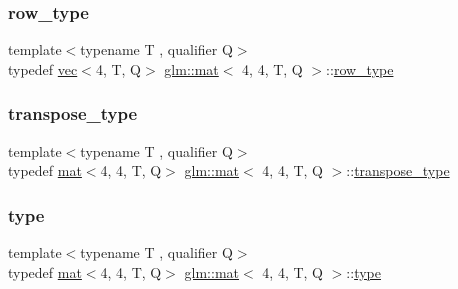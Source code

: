 \subsubsection{\texorpdfstring{row\+\_\+type}{row\_type}}
{\footnotesize\ttfamily template$<$typename T , qualifier Q$>$ \\
typedef \mbox{\hyperlink{structglm_1_1vec}{vec}}$<$4, T, Q$>$ \mbox{\hyperlink{structglm_1_1mat}{glm\+::mat}}$<$ 4, 4, T, Q $>$\+::\mbox{\hyperlink{structglm_1_1mat_3_014_00_014_00_01_t_00_01_q_01_4_a2f05ded6544c98508d5f29e498d2e4dd}{row\+\_\+type}}}

\mbox{\label{structglm_1_1mat_3_014_00_014_00_01_t_00_01_q_01_4_aae643ca23a5e538e908086e5149f500f}} 
\subsubsection{\texorpdfstring{transpose\+\_\+type}{transpose\_type}}
{\footnotesize\ttfamily template$<$typename T , qualifier Q$>$ \\
typedef \mbox{\hyperlink{structglm_1_1mat}{mat}}$<$4, 4, T, Q$>$ \mbox{\hyperlink{structglm_1_1mat}{glm\+::mat}}$<$ 4, 4, T, Q $>$\+::\mbox{\hyperlink{structglm_1_1mat_3_014_00_014_00_01_t_00_01_q_01_4_aae643ca23a5e538e908086e5149f500f}{transpose\+\_\+type}}}

\mbox{\label{structglm_1_1mat_3_014_00_014_00_01_t_00_01_q_01_4_a2151b2f14fc2ccf6e39a0ca3182270c2}} 
\subsubsection{\texorpdfstring{type}{type}}
{\footnotesize\ttfamily template$<$typename T , qualifier Q$>$ \\
typedef \mbox{\hyperlink{structglm_1_1mat}{mat}}$<$4, 4, T, Q$>$ \mbox{\hyperlink{structglm_1_1mat}{glm\+::mat}}$<$ 4, 4, T, Q $>$\+::\mbox{\hyperlink{structglm_1_1mat_3_014_00_014_00_01_t_00_01_q_01_4_a2151b2f14fc2ccf6e39a0ca3182270c2}{type}}}

